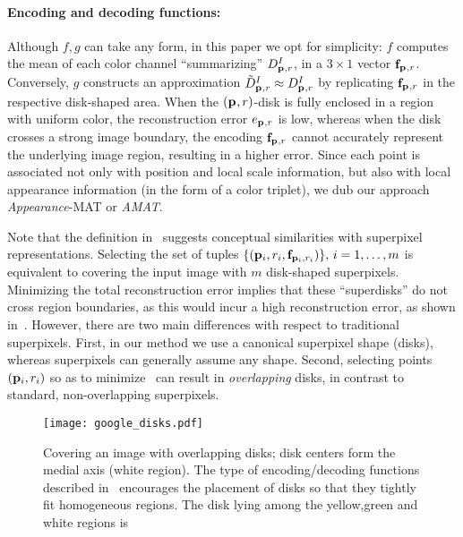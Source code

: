 \documentclass[10pt,twocolumn,letterpaper]{article}
\begin{document}
\paragraph{Encoding and decoding functions:} 
Although $f,g$ can take any form, in this paper we opt for simplicity:
$f$ computes the mean of each color channel ``summarizing'' $D_{\mathbf{p}_{},r}^I$, in a $3\times1$ vector $\mathbf{f}_{\mathbf{p}_{},r}$.
Conversely, $g$ constructs an approximation $\tilde{D}_{\mathbf{p}_{},r}^I \approx D_{\mathbf{p}_{},r}^I$ by replicating $\mathbf{f}_{\mathbf{p}_{},r}$ in the
respective disk-shaped area.
When the $(\mathbf{p}_{},r)$-disk is fully enclosed in a region with uniform color, the reconstruction error $e_{\mathbf{p}_{},r}$
is low, whereas when the disk crosses a strong image boundary, the encoding $\mathbf{f}_{\mathbf{p}_{},r}$ cannot accurately represent
the underlying image region, resulting in a higher error. Since each point is associated not only with position and local
scale information, but also with local appearance information (in the form of a color triplet), we dub our approach
\emph{Appearance}-MAT or \emph{AMAT}.

Note that the definition in~ suggests conceptual similarities with superpixel representations.
Selecting the set of tuples $\{ (\mathbf{p}_{i},r_i,\mathbf{f}_{\mathbf{p}_{i},r_i}) \},\,i=1,\ldots,m$ is equivalent to covering the input image
with $m$ disk-shaped superpixels. Minimizing the total reconstruction error implies that these ``superdisks'' do not
cross region boundaries, as this would incur a high reconstruction error, as shown in~.
However, there are two main differences with respect to traditional superpixels.
First, in our method we use a canonical
superpixel shape (disks), whereas superpixels can generally assume any shape. Second, selecting points $(\mathbf{p}_{i},r_i)$
so as to minimize~ can result in \emph{overlapping} disks, in contrast to standard, 
non-overlapping superpixels.

\begin{figure}[ht]
\centering
\texttt{[image: google\_disks.pdf]}
\caption{Covering an image with overlapping disks; disk centers form the medial axis (white region).
The type of encoding/decoding functions described in~ encourages  
the placement of disks so that they tightly fit homogeneous regions. 
The disk lying among the yellow,green and white regions is 
}
\label{fig:google}
\end{figure}
\end{document}
